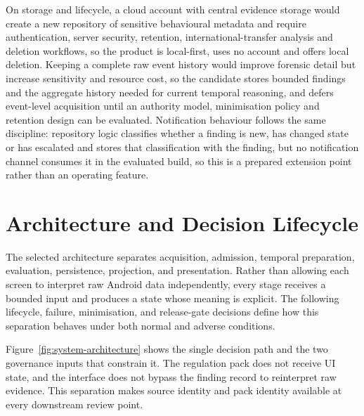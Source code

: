 On storage and lifecycle, a cloud account with central evidence storage would create a new repository of sensitive behavioural metadata and require authentication, server security, retention, international-transfer analysis and deletion workflows, so the product is local-first, uses no account and offers local deletion. Keeping a complete raw event history would improve forensic detail but increase sensitivity and resource cost, so the candidate stores bounded findings and the aggregate history needed for current temporal reasoning, and defers event-level acquisition until an authority model, minimisation policy and retention design can be evaluated. Notification behaviour follows the same discipline: repository logic classifies whether a finding is new, has changed state or has escalated and stores that classification with the finding, but no notification channel consumes it in the evaluated build, so this is a prepared extension point rather than an operating feature.

\section{Architecture and Decision Lifecycle}

The selected architecture separates acquisition, admission, temporal preparation, evaluation, persistence, projection, and presentation. Rather than allowing each screen to interpret raw Android data independently, every stage receives a bounded input and produces a state whose meaning is explicit. The following lifecycle, failure, minimisation, and release-gate decisions define how this separation behaves under both normal and adverse conditions.

Figure~\ref{fig:system-architecture} shows the single decision path and the two governance inputs that constrain it. The regulation pack does not receive UI state, and the interface does not bypass the finding record to reinterpret raw evidence. This separation makes source identity and pack identity available at every downstream review point.

